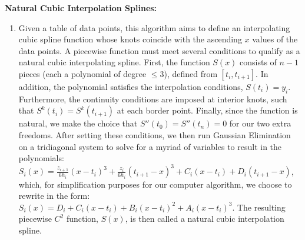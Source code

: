 \documentclass{amsart}
\begin{document}
\smallskip
\textbf{Natural Cubic Interpolation Splines:}
\begin{enumerate} 
	\item[] Given a table of data points, this algorithm aims to define an interpolating cubic spline function whose knots coincide with the ascending \(x\) values of the data points. A piecewise function must meet several conditions to qualify as a natural cubic interpolating spline. First, the function \(S(x)\) consists of \(n-1\) pieces (each a polynomial of degree \(\leq 3\)), defined from \([t_i, t_{i+1}]\). In addition, the polynomial satisfies the interpolation conditions, \(S(t_i) = y_i\). Furthermore, the continuity conditions are imposed at interior knots, such that \(S^k(t_i) = S^k(t_{i+1})\) at each border point. Finally, since the function is natural, we make the choice that \(S'' (t_0) = S'' (t_n) = 0\) for our two extra freedoms. After setting these conditions, we then run Gaussian Elimination on a tridiagonal system to solve for a myriad of variables to result in the polynomials: \(S_i(x) = \frac{z_{i+1}}{6h_i}(x-t_i)^3 + \frac{z_{i}}{6h_i}(t_{i+1}-x)^3 + C_i(x-t_i) + D_i(t_{i+1} -x)\), which, for simplification purposes for our computer algorithm, we choose to rewrite in the form: \(S_i(x) = D_i + C_i(x - t_i) + B_i(x - t_i)^2 + A_i(x - t_i)^3\). The resulting piecewise \(C^2\) function, \(S(x)\), is then called a natural cubic interpolation spline.
\end{enumerate}
		
\end{document}
